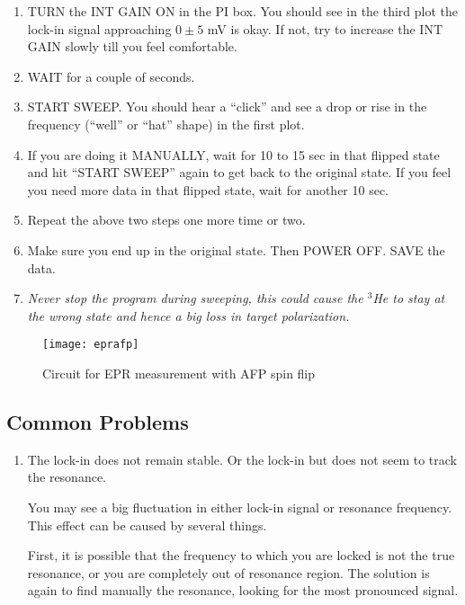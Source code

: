 {\begin{enumerate}
\item TURN the INT GAIN ON in the PI box. You should see in the third plot 
the lock-in signal approaching $0 \pm 5$ mV is okay. If not, try to increase the INT GAIN slowly till you feel comfortable.

\item WAIT for a couple of seconds.
  
\item START SWEEP. You should hear a ``click'' and see a drop or rise in the frequency (``well'' or ``hat'' shape) in the first plot.

\item If you are doing it MANUALLY, wait for 10 to 15 sec in that flipped state and hit ``START SWEEP'' again to get back to the original state. If you feel you need more data in that flipped state, wait for another 10 sec.

\item Repeat the above two steps one more time or two.

\item Make sure you end up in the original state. Then POWER OFF. SAVE the data. 
\item \emph{Never stop the program during sweeping, this could cause the $^3$He
 to stay at the wrong state and hence a big loss in target polarization. }

\end{enumerate}        

\begin{figure}
\begin{center}
\centerline{ \texttt{[image: eprafp]}}
\caption{Circuit for EPR measurement with AFP spin flip}
\end{center}
\label{fig2:epr}
\end{figure}

\subsection{Common Problems}

\begin{enumerate}


\item The lock-in does not remain stable.  
Or the lock-in but does not seem to track the resonance.

You may see a big fluctuation in either lock-in signal or resonance frequency.
This effect can be caused by several things.  

First, it is possible that
the frequency to which you are locked is not the true resonance, or
you are completely out of resonance region.
The solution is again to find manually the resonance, looking for the
most pronounced signal.  


\end{enumerate}}
